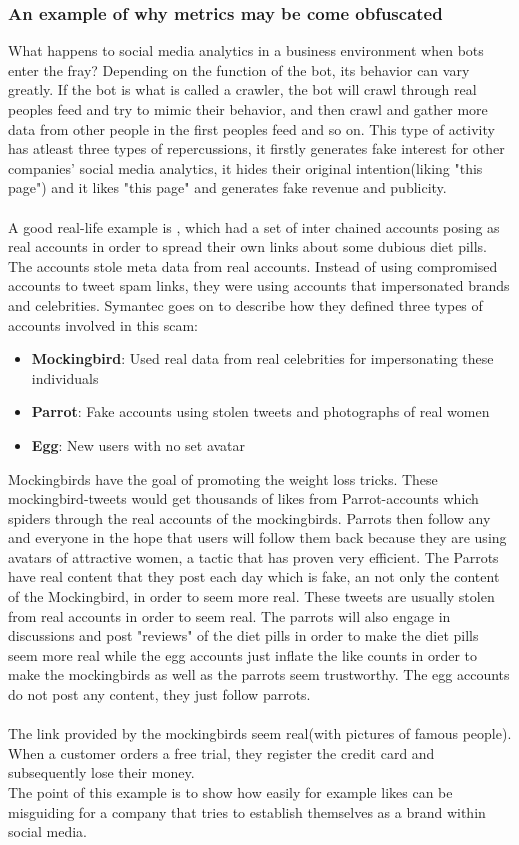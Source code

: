\subsubsection*{An example of why metrics may be come obfuscated}\label{obfuscatedmetrics}
What happens to social media analytics in a business environment when bots enter the fray? Depending on the function of the bot, its behavior can vary greatly. If the bot is what is called a crawler, the bot will crawl through real peoples feed and try to mimic their behavior, and then crawl and gather more data from other people in the first peoples feed and so on. This type of activity has atleast three types of repercussions, it firstly generates fake interest for other companies' social media analytics, it hides their original intention(liking "this page") and it likes "this page" and generates fake revenue and publicity.
\\
\\
\label{Symantec:mockingbirds}A good real-life example is \cite{Symantec:Narang}, which had a set of inter chained accounts posing as real accounts in order to spread their own links about some dubious diet pills. The accounts stole meta data from real accounts. Instead of using compromised
accounts to tweet spam links, they were using accounts that impersonated brands and
celebrities. Symantec goes on to describe how they defined three types of accounts involved in this scam:
\begin{itemize}
\item {\textbf{Mockingbird}: Used real data from real celebrities for impersonating these individuals}
\item{\textbf{Parrot}: Fake accounts using stolen tweets and photographs of real women}
\item{\textbf{Egg}: New users with no set avatar}
\end{itemize}
Mockingbirds have the goal of promoting the weight loss tricks. These mockingbird-tweets would get thousands of likes from Parrot-accounts which spiders through the real accounts of the mockingbirds. Parrots then follow any and everyone in the hope that users will follow them back because they are using avatars of attractive women, a tactic that has proven very efficient. The Parrots have real content that they post each day which is fake, an not only the content of the Mockingbird, in order to seem more real. These tweets are usually stolen from real accounts in order to seem real.  The parrots will also engage in discussions and post "reviews" of the diet pills in order to make the diet pills seem more real while the egg accounts just inflate the like counts in order to make the mockingbirds as well as the parrots seem trustworthy. The egg accounts do not post any content, they just follow parrots.
\\
\\ The link provided by the mockingbirds seem real(with pictures of famous people). When a customer orders a free trial, they register the credit card and subsequently lose their money. 
\\
The point of this example is to show how easily for example likes can be misguiding for a company that tries to establish themselves as a brand within social media. 

